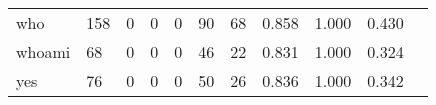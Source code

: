 \begin{longtable}{lp{1.2cm}p{1.2cm}p{1.2cm}p{1.2cm}p{1.2cm}p{1.2cm}p{1.2cm}p{1.2cm}p{1.2cm}p{1.2cm}}
who       &                                   158 &                                                  0 &                                                  0 &                                                  0 &                                                 90 &                                                 68 &                                         0.858 &                                              1.000 &                                              0.430 \\
whoami    &                                    68 &                                                  0 &                                                  0 &                                                  0 &                                                 46 &                                                 22 &                                         0.831 &                                              1.000 &                                              0.324 \\
yes       &                                    76 &                                                  0 &                                                  0 &                                                  0 &                                                 50 &                                                 26 &                                         0.836 &                                              1.000 &                                              0.342 \\
\end{longtable}
